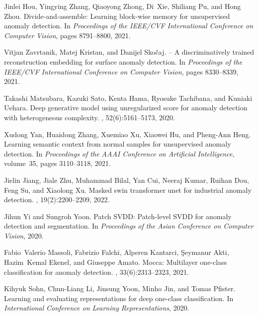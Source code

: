 \documentclass{article}
\begin{document}
{\begin{thebibliography}{10}
Jinlei Hou, Yingying Zhang, Qiaoyong Zhong, Di~Xie, Shiliang Pu, and Hong Zhou.
\newblock Divide-and-assemble: Learning block-wise memory for unsupervised
  anomaly detection.
\newblock In {\em Proceedings of the IEEE/CVF International Conference on
  Computer Vision}, pages 8791--8800, 2021.

Vitjan Zavrtanik, Matej Kristan, and Danijel Sko{\v{c}}aj.
 -- {A} discriminatively trained reconstruction embedding for
  surface anomaly detection.
\newblock In {\em Proceedings of the IEEE/CVF International Conference on
  Computer Vision}, pages 8330--8339, 2021.

Takashi Matsubara, Kazuki Sato, Kenta Hama, Ryosuke Tachibana, and Kuniaki
  Uehara.
\newblock Deep generative model using unregularized score for anomaly detection
  with heterogeneous complexity.
, 52(6):5161--5173, 2020.

Xudong Yan, Huaidong Zhang, Xuemiao Xu, Xiaowei Hu, and Pheng-Ann Heng.
\newblock Learning semantic context from normal samples for unsupervised
  anomaly detection.
\newblock In {\em Proceedings of the AAAI Conference on Artificial
  Intelligence}, volume~35, pages 3110--3118, 2021.

Jielin Jiang, Jiale Zhu, Muhammad Bilal, Yan Cui, Neeraj Kumar, Ruihan Dou,
  Feng Su, and Xiaolong Xu.
\newblock Masked swin transformer unet for industrial anomaly detection.
, 19(2):2200--2209,
  2022.

Jihun Yi and Sungroh Yoon.
\newblock Patch {SVDD}: Patch-level {SVDD} for anomaly detection and
  segmentation.
\newblock In {\em Proceedings of the Asian Conference on Computer Vision},
  2020.

Fabio~Valerio Massoli, Fabrizio Falchi, Alperen Kantarci, {\c{S}}eymanur Akti,
  Hazim~Kemal Ekenel, and Giuseppe Amato.
\newblock Mocca: Multilayer one-class classification for anomaly detection.
,
  33(6):2313--2323, 2021.

Kihyuk Sohn, Chun-Liang Li, Jinsung Yoon, Minho Jin, and Tomas Pfister.
\newblock Learning and evaluating representations for deep one-class
  classification.
\newblock In {\em International Conference on Learning Representations}, 2020.


\end{thebibliography}}
\end{document}

